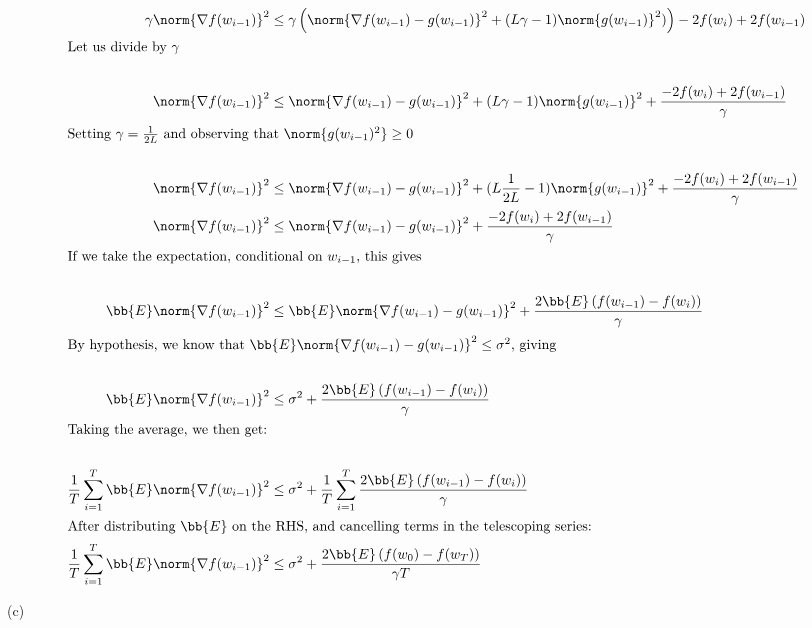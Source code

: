 \documentclass[../main.tex]{subfiles}
\begin{document}
\begin{align*}
    \gamma\norm{\nabla f(w_{i-1})}^2 &\leq \gamma \left( \norm{\nabla f(w_{i-1}) - g(w_{i-1})}^2 + (L\gamma - 1)\norm{g(w_{i-1})}^2)\right) - 2f(w_i) + 2f(w_{i-1})  \\
    \intertext{Let us divide by $\gamma$} \\
    \norm{\nabla f(w_{i-1})}^2 &\leq \norm{\nabla f(w_{i-1}) - g(w_{i-1})}^2 + (L\gamma - 1)\norm{g(w_{i-1})}^2 + \frac{-2f(w_i) + 2f(w_{i-1})}{\gamma}  \\
    \intertext{Setting $\gamma = \frac{1}{2L}$ and observing that $\norm{g(w_{i-1})^2} \geq 0$} \\
    \norm{\nabla f(w_{i-1})}^2 &\leq \norm{\nabla f(w_{i-1}) - g(w_{i-1})}^2 + (L\frac{1}{2L} - 1)\norm{g(w_{i-1})}^2 + \frac{-2f(w_i) + 2f(w_{i-1})}{\gamma}  \\
    \norm{\nabla f(w_{i-1})}^2 &\leq \norm{\nabla f(w_{i-1}) - g(w_{i-1})}^2 + \frac{-2f(w_i) + 2f(w_{i-1})}{\gamma}  \\
    \intertext{If we take the expectation, conditional on $w_{i-1}$, this gives} \\
    \bb{E}\norm{\nabla f(w_{i-1})}^2 &\leq \bb{E}\norm{\nabla f(w_{i-1}) - g(w_{i-1})}^2 + \frac{2\bb{E}\left(f(w_{i-1}) - f(w_{i})\right)}{\gamma}  \\
    \intertext{By hypothesis, we know that $\bb{E}\norm{\nabla f(w_{i-1}) - g(w_{i-1})}^2 \leq \sigma^2$, giving}\\
    \bb{E}\norm{\nabla f(w_{i-1})}^2 &\leq \sigma^2 + \frac{2\bb{E}\left(f(w_{i-1}) - f(w_{i})\right)}{\gamma}  \\
    \intertext{Taking the average, we then get:} \\
    \frac{1}{T}\sum_{i=1}^{T}\bb{E}\norm{\nabla f(w_{i-1})}^2 &\leq \sigma^2 + \frac{1}{T}\sum_{i=1}^{T}\frac{2\bb{E}\left(f(w_{i-1}) - f(w_{i})\right)}{\gamma}  \\
    \intertext{After distributing $\bb{E}$ on the RHS, and cancelling terms in the telescoping series:}
    \frac{1}{T}\sum_{i=1}^{T}\bb{E}\norm{\nabla f(w_{i-1})}^2 &\leq \sigma^2 + \frac{2\bb{E}\left(f(w_{0}) - f(w_{T})\right)}{\gamma T}  \\
\end{align*}

(c)\\
\end{document}
